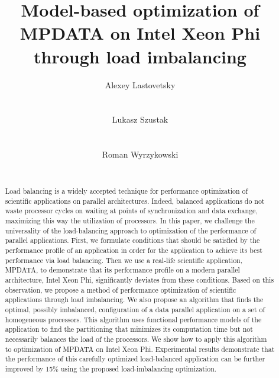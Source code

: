 \documentclass{acm_proc_article-sp}
\begin{document}
\title{Model-based optimization of MPDATA on Intel Xeon Phi through load imbalancing}


\author{
\alignauthor
Alexey Lastovetsky \\
       \\
       \\
\alignauthor
Lukasz Szustak \\
       \\
       \\
\alignauthor
Roman Wyrzykowski \\
       \\
}

\maketitle
\begin{abstract}
Load balancing is a widely accepted technique for performance optimization of scientific applications on parallel architectures. Indeed, balanced applications do not waste processor cycles on waiting at points of synchronization and data exchange, maximizing this way the utilization of processors. In this paper, we challenge the universality of the load-balancing approach to optimization of the performance of parallel applications. First, we formulate conditions that should be satisfied by the performance profile of an application in order for the application to achieve its best performance via load balancing. Then we use a real-life scientific application, MPDATA, to demonstrate that its performance profile on a modern parallel architecture, Intel Xeon Phi, significantly deviates from these conditions. Based on this observation, we propose a method of performance optimization of scientific applications through load imbalancing. We also propose an algorithm that finds the optimal, possibly imbalanced, configuration of a data parallel application on a set of homogeneous processors. This algorithm uses functional performance models of the application to find the partitioning that minimizes its computation time but not necessarily balances the load of the processors. We show how to apply this algorithm to optimization of MPDATA on Intel Xeon Phi. Experimental results demonstrate that the performance of this carefully optimized load-balanced application can be further improved by 15\% using the proposed load-imbalancing optimization.
\end{abstract}
\end{document}
